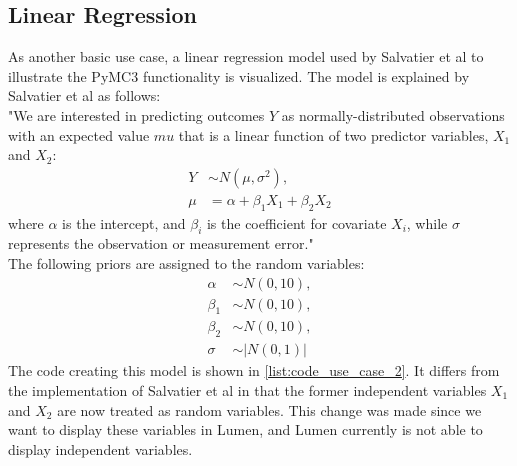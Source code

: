 \documentclass{article}
\begin{document}
\subsection{Linear Regression}
\label{subsec:linreg}
As another basic use case, a linear regression model used by Salvatier et al to illustrate the PyMC3 functionality \cite{Salvatier2016} is visualized. 
The model is explained by Salvatier et al as follows:\\
"We are interested in predicting outcomes $Y$ as normally-distributed observations with an expected value $mu$ that is a linear function of two predictor variables, $X_1$ and $X_2$:
\begin{equation}
\begin{split}
Y &\sim N(\mu,\sigma^2), \\
\mu &= \alpha + \beta_1 X_1 + \beta_2 X_2
\end{split}
\end{equation}
where $\alpha$ is the intercept, and $\beta_i$ is the coefficient for covariate $X_i$, while $\sigma$ represents the observation or measurement error."\\
The following priors are assigned to the random variables:
\begin{equation}
\begin{split}
\alpha &\sim N(0,10), \\
\beta_1 &\sim N(0,10), \\
\beta_2 &\sim N(0,10), \\
\sigma &\sim |N(0,1)|
\end{split}
\end{equation}
The code creating this model is shown in \autoref{list:code_use_case_2}. It differs from the implementation of Salvatier et al in that the former independent variables $X_1$ and $X_2$ are now treated as random variables. This change was made since we want to display these variables in Lumen, and Lumen currently is not able to display independent variables.\\
\end{document}
